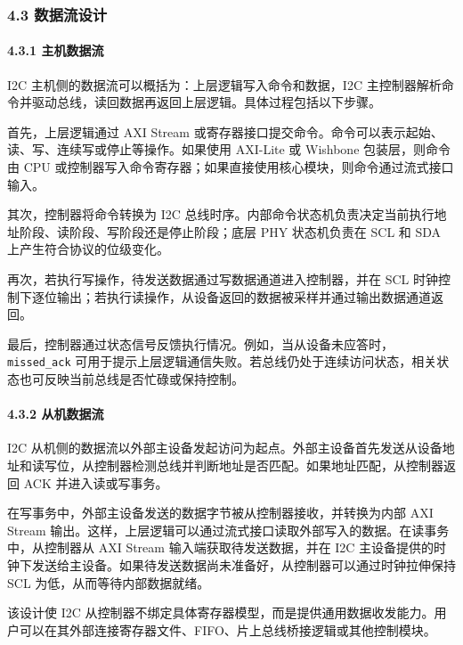 \subsubsection{4.3 数据流设计}\label{ux6570ux636eux6d41ux8bbeux8ba1}

\paragraph{4.3.1 主机数据流}\label{ux4e3bux673aux6570ux636eux6d41}

I2C 主机侧的数据流可以概括为：上层逻辑写入命令和数据，I2C 主控制器解析命令并驱动总线，读回数据再返回上层逻辑。具体过程包括以下步骤。

首先，上层逻辑通过 AXI Stream 或寄存器接口提交命令。命令可以表示起始、读、写、连续写或停止等操作。如果使用 AXI-Lite 或 Wishbone 包装层，则命令由 CPU 或控制器写入命令寄存器；如果直接使用核心模块，则命令通过流式接口输入。

其次，控制器将命令转换为 I2C 总线时序。内部命令状态机负责决定当前执行地址阶段、读阶段、写阶段还是停止阶段；底层 PHY 状态机负责在 SCL 和 SDA 上产生符合协议的位级变化。

再次，若执行写操作，待发送数据通过写数据通道进入控制器，并在 SCL 时钟控制下逐位输出；若执行读操作，从设备返回的数据被采样并通过输出数据通道返回。

最后，控制器通过状态信号反馈执行情况。例如，当从设备未应答时，\texttt{missed\_ack} 可用于提示上层逻辑通信失败。若总线仍处于连续访问状态，相关状态也可反映当前总线是否忙碌或保持控制。

\paragraph{4.3.2 从机数据流}\label{ux4eceux673aux6570ux636eux6d41}

I2C 从机侧的数据流以外部主设备发起访问为起点。外部主设备首先发送从设备地址和读写位，从控制器检测总线并判断地址是否匹配。如果地址匹配，从控制器返回 ACK 并进入读或写事务。

在写事务中，外部主设备发送的数据字节被从控制器接收，并转换为内部 AXI Stream 输出。这样，上层逻辑可以通过流式接口读取外部写入的数据。在读事务中，从控制器从 AXI Stream 输入端获取待发送数据，并在 I2C 主设备提供的时钟下发送给主设备。如果待发送数据尚未准备好，从控制器可以通过时钟拉伸保持 SCL 为低，从而等待内部数据就绪。

该设计使 I2C 从控制器不绑定具体寄存器模型，而是提供通用数据收发能力。用户可以在其外部连接寄存器文件、FIFO、片上总线桥接逻辑或其他控制模块。

